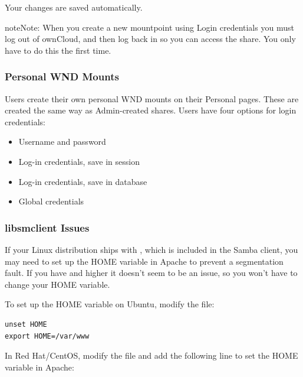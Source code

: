 \documentclass[letterpaper,10pt,english]{sphinxmanual}
\begin{document}
Your changes are saved automatically.

\begin{notice}{note}{Note:}
When you create a new mountpoint using Login credentials you must log
out of ownCloud, and then log back in so you can access the share. You
only have to do this the first time.
\end{notice}


\subsubsection{Personal WND Mounts}
\label{enterprise_external_storage/windows-network-drive_configuration:personal-wnd-mounts}
Users create their own personal WND mounts on their Personal pages. These are
created the same way as Admin-created shares. Users have four options for
login credentials:
\begin{itemize}
\item {} 
Username and password

\item {} 
Log-in credentials, save in session

\item {} 
Log-in credentials, save in database

\item {} 
Global credentials

\end{itemize}


\subsubsection{libsmclient Issues}
\label{enterprise_external_storage/windows-network-drive_configuration:libsmclient-issues}
If your Linux distribution ships with , which is included in
the Samba client, you may need to set up the HOME variable in Apache to prevent
a segmentation fault. If you have  and higher it doesn't
seem to be an issue, so you won't have to change your HOME variable.

To set up the HOME variable on Ubuntu, modify the 
file:

\begin{Verbatim}[commandchars=\\\{\}]
unset HOME
export HOME=/var/www
\end{Verbatim}

In Red Hat/CentOS, modify the  file and add the
following line to set the HOME variable in Apache:
\end{document}
